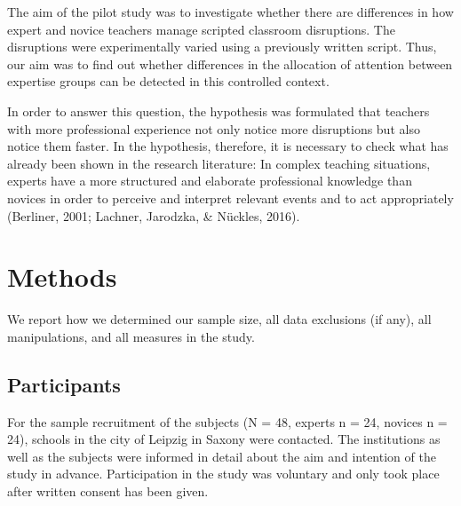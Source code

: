 \documentclass[
  english,
  man,floatsintext]{apa6}
\begin{document}
The aim of the pilot study was to investigate whether there are differences in how expert and novice teachers manage scripted classroom disruptions. The disruptions were experimentally varied using a previously written script. Thus, our aim was to find out whether differences in the allocation of attention between expertise groups can be detected in this controlled context.

In order to answer this question, the hypothesis was formulated that teachers with more professional experience not only notice more disruptions but also notice them faster. In the hypothesis, therefore, it is necessary to check what has already been shown in the research literature: In complex teaching situations, experts have a more structured and elaborate professional knowledge than novices in order to perceive and interpret relevant events and to act appropriately (Berliner, 2001; Lachner, Jarodzka, \& Nückles, 2016).

\hypertarget{methods}{%
\section{Methods}\label{methods}}

We report how we determined our sample size, all data exclusions (if any), all manipulations, and all measures in the study.

\hypertarget{participants}{%
\subsection{Participants}\label{participants}}

For the sample recruitment of the subjects (N = 48, experts n = 24, novices n = 24), schools in the city of Leipzig in Saxony were contacted. The institutions as well as the subjects were informed in detail about the aim and intention of the study in advance. Participation in the study was voluntary and only took place after written consent has been given.
\end{document}
